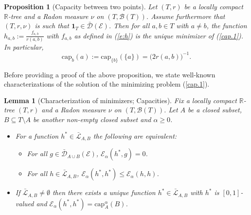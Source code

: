 \documentclass[11pt]{amsart}
\numberwithin{equation}{section}
\newtheorem{lemma}[definition]{Lemma}
\newtheorem{proposition}[definition]{Proposition}
\begin{document}
{\begin{proposition}[Capacity between two points] Let $(T,r)$ be a locally compact ${{\mathbb R}}$-tree and a Radon measure $\nu$ {on $(T,{\mathcal B}(T))$}.  Assume furthermore that $(T,r,\nu)$ is such that $\mathbf{1}_T\in\bar{\mathcal D}({\mathcal E})$.
Then for all ${a},{b}\in T$ with ${a}\not ={b}$,
the function $h_{{a},{b}}:=\frac{f_{{a},{b}}}{r({a},{b})}$ with $f_{{a},{b}}$ as defined in (\ref{e:h}) is the unique minimizer of (\ref{cap.1}).
\label{P:04}
In particular,
\begin{equation}
\label{capxy}
   \mathrm{cap}_{{b}}({a}):=\mathrm{cap}_{\{{b}\}}(\{{a}\})=\big(2r({a},{b})\big)^{-1}.
\end{equation}
\end{proposition}{\smallskip}

Before providing a proof of the above proposition, we state well-known characterizations of the solution of the minimizing problem (\ref{cap.1}).
\begin{lemma}[Characterization of minimizers; Capacities] Fix a locally compact ${{\mathbb R}}$-tree $(T,r)$ and a Radon measure $\nu$ on $(T,{\mathcal B}(T))$. Let $A$ be a closed subset,
${B}\subseteq T\setminus A$  be another {non-empty} closed subset and $\alpha\ge 0$.
\begin{itemize}
\item[(i)]
For a function $h^\ast\in\bar{\mathcal L}_{A,B}$ the
following are equivalent: \label{L:05}
\begin{itemize}
\item[(a)] For all $g\in\bar{\mathcal D}_{A\cup B}({\mathcal E})$,
   $\mathcal E_\alpha(h^\ast,g)=0$.
\item[(b)] For all $h\in\bar{\mathcal L}_{A,B}$,
${\mathcal E}_\alpha(h^\ast,h^\ast)\le{\mathcal E}_\alpha(h,h)$.
\end{itemize}
\item[(ii)] If $\bar{\mathcal L}_{A,B} \neq \emptyset$ then there exists a unique function $h^\ast\in\bar{\mathcal L}_{A,B}$ with $h^\ast$ is $[0,1]$-valued and
$\mathcal{E}_\alpha(h^\ast,h^\ast)=\mathrm{cap}_{A}^\alpha({B})$.
\end{itemize}
\end{lemma}{\smallskip}

}
\end{document}
